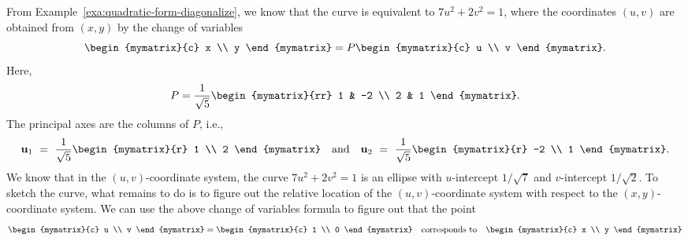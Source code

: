 \begin{solution}
  From Example~\ref{exa:quadratic-form-diagonalize}, we know that the
  curve is equivalent to $7u^2 + 2v^2 = 1$, where the coordinates
  $(u,v)$ are obtained from $(x,y)$ by the change of variables
  \begin{equation*}
    \begin{mymatrix}{c} x \\ y \end{mymatrix}
    = P \begin{mymatrix}{c} u \\ v \end{mymatrix}.
  \end{equation*}
  Here,
  \begin{equation*}
    P
    = \frac{1}{\sqrt{5}} \begin{mymatrix}{rr} 1 & -2 \\ 2 & 1 \end{mymatrix}.
  \end{equation*}
  The principal axes are the columns of $P$, i.e.,
  \begin{equation*}
    \vect{u}_1
    ~=~ \frac{1}{\sqrt{5}} \begin{mymatrix}{r} 1 \\ 2 \end{mymatrix}
    \quad\mbox{and}\quad
    \vect{u}_2
    ~=~ \frac{1}{\sqrt{5}} \begin{mymatrix}{r} -2 \\ 1 \end{mymatrix}.    
  \end{equation*}
  We know that in the $(u,v)$-coordinate system, the curve
  $7u^2+2v^2=1$ is an ellipse with $u$-intercept $1/\sqrt{7}$ and
  $v$-intercept $1/\sqrt{2}$. To sketch the curve, what remains to do
  is to figure out the relative location of the $(u,v)$-coordinate
  system with respect to the $(x,y)$-coordinate system. We can use the
  above change of variables formula to figure out that the point
  \begin{equation*}
    \begin{mymatrix}{c} u \\ v \end{mymatrix}
    =
    \begin{mymatrix}{c} 1 \\ 0 \end{mymatrix}
    \quad\mbox{corresponds to}\quad
    \begin{mymatrix}{c} x \\ y \end{mymatrix}

\end{equation*}
\end{solution}

